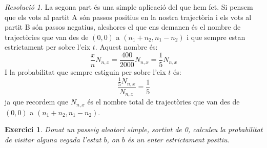 \documentclass[10pt,a4paper]{article}
\newtheorem{exercici}{Exercici}
\theoremstyle{definition}
\theoremstyle{remark}
\newtheorem*{res}{Resolució}
\begin{document}
\begin{res}
  La segona part és una simple aplicació del que hem fet. Si pensem que els vots al partit A són passos positius en la nostra trajectòria i els vots al partit B són passos negatius, aleshores el que ens demanen és el nombre de trajectòries que van des de $(0,0)$ a $(n_1+n_2,n_1-n_2)$ i que sempre estan estrictament per sobre l'eix $t$. Aquest nombre és:
  $$\frac{x}{n}N_{n,x}=\frac{400}{2000}N_{n,x}=\frac{1}{5}N_{n,x}$$
  I la probabilitat que sempre estiguin per sobre l'eix $t$ és: $$\frac{\frac{1}{5}N_{n,x}}{N_{n,x}}=\frac{1}{5}$$
  ja que recordem que $N_{n,x}$ és el nombre total de trajectòries que van des de $(0,0)$ a $(n_1+n_2,n_1-n_2)$.
\end{res}
\begin{exercici}
  Donat un passeig aleatori simple, sortint de 0, calculeu la probabilitat de visitar alguna vegada l'estat $b$, on $b$ és un enter estrictament positiu.
\end{exercici}
\end{document}

